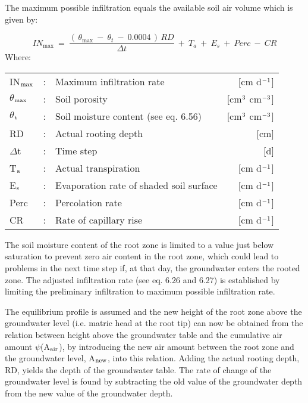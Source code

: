 The maximum possible infiltration equals the available soil air volume which is given by:

\begin{equation}
IN _{\max } ~=~{\frac{(\, \theta _{\max } ~-~ \theta _{t} ~-~ 0.0004\, )\, RD}{\Delta t}} ~+~ T _{a} ~+~ E _{s} ~+~ Perc ~-~ CR
\end{equation}
Where:\\[5pt]
\begin{tabularx}{\textwidth}{llXr}
IN$_{{\rm max}}$ &:& Maximum infiltration rate  & [cm d$^{{\rm -1}}$]\\
$\theta$$_{{\rm max}}$ &:& Soil porosity  & [cm$^{{\rm 3}}$ cm$^{{\rm -3}}$]\\
$\theta$$_{{\rm t}}$ &:& Soil moisture content (see eq. 6.56)  & [cm$^{{\rm 3}}$ cm$^{{\rm -3}}$]\\
RD &:& Actual rooting depth  & [cm]\\
$\Delta$t &:& Time step  & [d]\\
T$_{{\rm a}}$ &:& Actual transpiration  & [cm d$^{{\rm -1}}$]\\
E$_{{\rm s}}$ &:& Evaporation rate of shaded soil surface  & [cm d$^{{\rm -1}}$]\\
Perc &:& Percolation rate  & [cm d$^{{\rm -1}}$]\\
CR &:& Rate of capillary rise  & [cm d$^{{\rm -1}}$]\\
\end{tabularx}

The soil moisture content of the root zone is limited to a value just below saturation to
prevent zero air content in the root zone, which could lead to problems in the next time
step if, at that day, the groundwater enters the rooted zone. The adjusted infiltration rate
(see eq. 6.26 and 6.27) is established by limiting the preliminary infiltration to maximum
possible infiltration rate.

The equilibrium profile is assumed and the new height of the root zone above the
groundwater level (i.e. matric head at the root tip) can now be obtained from the relation
between height above the groundwater table and the cumulative air amount $\psi$(A$_{{\rm air}}$), by
introducing the new air amount between the root zone and the groundwater level, A$_{{\rm new}}$,
into this relation. Adding the actual rooting depth, RD, yields the depth of the groundwa\-ter 
table. The rate of change of the groundwater level is found by subtracting the old
value of the groundwater depth from the new value of the groundwater depth. 

